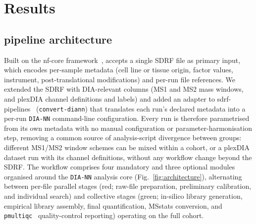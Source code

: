 \documentclass[preprint,12pt]{elsarticle}
\begin{document}
\section{Results}
\label{sec:results}
\subsection{\quantmsdiann{} pipeline architecture}
\label{sec:architecture}

Built on the nf-core framework~\cite{ewels2020nfcore}, \quantmsdiann{} accepts a single SDRF file as primary input, which encodes per-sample metadata (cell line or tissue origin, factor values, instrument, post-translational modifications) and per-run file references. We extended the SDRF with DIA-relevant columns (MS1 and MS2 mass windows, and plexDIA channel definitions and labels) and added an adapter to sdrf-pipelines~\cite{dai2021sdrf} (\texttt{convert-diann}) that translates each run's declared metadata into a per-run \texttt{DIA-NN} command-line configuration. Every run is therefore parametrised from its own metadata with no manual configuration or parameter-harmonisation step, removing a common source of analysis-script divergence between groups: different MS1/MS2 window schemes can be mixed within a cohort, or a plexDIA dataset run with its channel definitions, without any workflow change beyond the SDRF.
The workflow comprises four mandatory and three optional modules organised around the \texttt{DIA-NN} analysis core (Fig.~\ref{fig:architecture}), alternating between per-file parallel stages (red; raw-file preparation, preliminary calibration, and individual search) and collective stages (green; in-silico library generation, empirical library assembly, final quantification, MSstats conversion, and \texttt{pmultiqc}~\cite{yue2026pmultiqc} quality-control reporting) operating on the full cohort.
\end{document}

